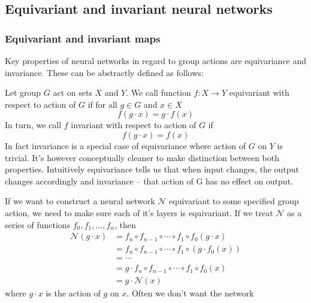 \subsection{Equivariant and invariant neural networks}
    \subsubsection{Equivariant and invariant maps}
    \label{sec:theoretical_equiinv}
    \hspace{0.5cm}
     Key properties of neural networks in regard to group actions are equivariance and invariance.
        These can be abstractly defined as follows: \par
        Let group $G$ act on sets $X$ and $Y$. We call function $f: X \rightarrow Y$ equivariant
        with respect to action of $G$ if for all $g \in G$ and $x \in X$
        \begin{equation}
            f(g \cdot x) = g \cdot f(x)
        \end{equation}
        In turn, we call $f$ invariant with respect to action of $G$ if
        \begin{equation}
            f(g \cdot x) = f(x)
        \end{equation}
        In fact invariance is a special case of equivariance where action of $G$ on $Y$ is trivial.
        It's however conceptually cleaner to make distinction between both properties.
        Intuitively equivariance tells us that when input changes, the output changes accordingly
        and invariance -- that action of G has no effect on output.\par
            If we want to construct a neural network $\mathcal{N}$ equivariant to some
        specified group action, we need to make sure each of it's layers is equivariant.
        If we treat $\mathcal{N}$ as a series of functions $f_0,f_1,...,f_n$, then
        \begin{align*}
            \mathcal{N}(g \cdot x) &=
            f_n \circ f_{n-1} \circ \cdots \circ f_1 \circ f_0(g\cdot x)  \\
            &= f_n \circ f_{n-1} \circ \cdots \circ f_1 \circ \left( g \cdot f_0(x) \right) \\
            &= \cdots \\
            &= g \cdot f_n \circ f_{n-1} \circ \cdots \circ f_1 \circ f_0(x) \\
            &= g \cdot \mathcal{N}(x)
        \end{align*}
        where $g\cdot x$ is the action of $g$ on $x$. Often we don't want the network
